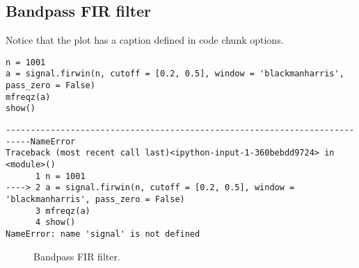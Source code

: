 \documentclass[a4paper,11pt,final]{article}
\begin{document}
\subsection{Bandpass FIR filter}

Notice that the plot has a caption defined in code chunk options.



\begin{verbatim}
n = 1001
a = signal.firwin(n, cutoff = [0.2, 0.5], window = 'blackmanharris', pass_zero = False)
mfreqz(a)
show()
\end{verbatim}
\begin{verbatim}
---------------------------------------------------------------------------NameError
Traceback (most recent call last)<ipython-input-1-360bebdd9724> in
<module>()
      1 n = 1001
----> 2 a = signal.firwin(n, cutoff = [0.2, 0.5], window =
'blackmanharris', pass_zero = False)
      3 mfreqz(a)
      4 show()
NameError: name 'signal' is not defined
\end{verbatim}
\begin{figure}[htpb]
\center
\caption{Bandpass FIR filter.}
\label{fig:None}
\end{figure}
\end{document}
